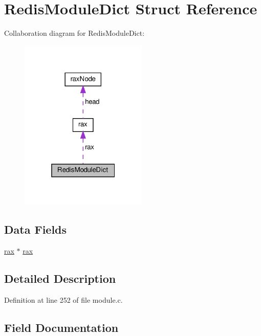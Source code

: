 \hypertarget{struct_redis_module_dict}{}\section{Redis\+Module\+Dict Struct Reference}
\label{struct_redis_module_dict}


Collaboration diagram for Redis\+Module\+Dict\+:
\nopagebreak
\begin{figure}[H]
\begin{center}
\leavevmode
\includegraphics[width=172pt]{struct_redis_module_dict__coll__graph}
\end{center}
\end{figure}
\subsection*{Data Fields}
\begin{DoxyCompactItemize}
\item 
\hyperlink{structrax}{rax} $\ast$ \hyperlink{struct_redis_module_dict_a5e94d4d7ba0112aeda6ee7b1ec15cf54}{rax}
\end{DoxyCompactItemize}


\subsection{Detailed Description}


Definition at line 252 of file module.\+c.



\subsection{Field Documentation}
\mbox{\label{struct_redis_module_dict_a5e94d4d7ba0112aeda6ee7b1ec15cf54}} 
